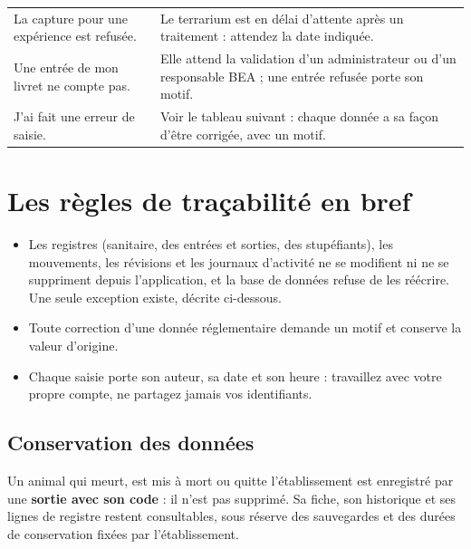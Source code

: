 \documentclass[11pt,a4paper]{article}
\begin{document}
\begin{center}
\begin{tabularx}{\textwidth}{@{}>{\raggedright\arraybackslash}p{5.2cm}X@{}}
La capture pour une expérience est refusée. & Le terrarium est en délai d'attente après un traitement : attendez la date indiquée.\\
Une entrée de mon livret ne compte pas. & Elle attend la validation d'un administrateur ou d'un responsable BEA ; une entrée refusée porte son motif.\\
J'ai fait une erreur de saisie. & Voir le tableau suivant : chaque donnée a sa façon d'être corrigée, avec un motif.\\
\bottomrule
\end{tabularx}
\end{center}

\section{Les règles de traçabilité en bref}
\begin{trace}
\begin{itemize}
  \item Les registres (sanitaire, des entrées et sorties, des stupéfiants),
    les mouvements, les révisions et les journaux d'activité ne se modifient
    ni ne se suppriment depuis l'application, et la base de données refuse
    de les réécrire. Une seule exception existe, décrite ci-dessous.
  \item Toute correction d'une donnée réglementaire demande un motif et
    conserve la valeur d'origine.
  \item Chaque saisie porte son auteur, sa date et son heure : travaillez
    avec votre propre compte, ne partagez jamais vos identifiants.
\end{itemize}
\end{trace}
\subsection{Conservation des données}\label{sec:conservation}
Un animal qui meurt, est mis à mort ou quitte l'établissement est enregistré
par une \textbf{sortie avec son code} : il n'est pas supprimé. Sa fiche, son
historique et ses lignes de registre restent consultables, sous réserve des
sauvegardes et des durées de conservation fixées par l'établissement.
\end{document}
